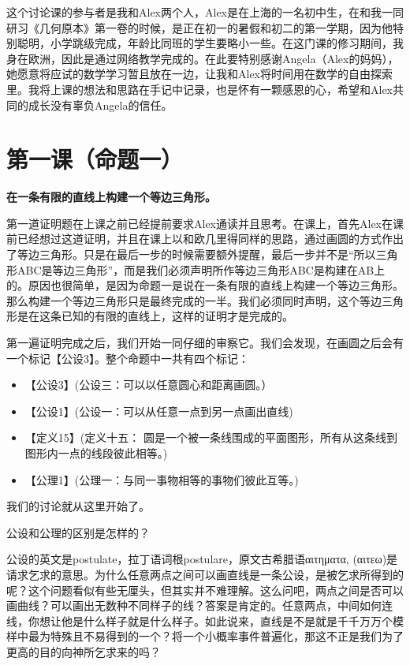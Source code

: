 \documentclass[
]{book}
\providecommand{\tightlist}{%
  \setlength{\itemsep}{0pt}\setlength{\parskip}{0pt}}
\begin{document}
这个讨论课的参与者是我和Alex两个人，Alex是在上海的一名初中生，在和我一同研习《几何原本》第一卷的时候，是正在初一的暑假和初二的第一学期，因为他特别聪明，小学跳级完成，年龄比同班的学生要略小一些。在这门课的修习期间，我身在欧洲，因此是通过网络教学完成的。在此要特别感谢Angela（Alex的妈妈），她愿意将应试的数学学习暂且放在一边，让我和Alex将时间用在数学的自由探索里。我将上课的想法和思路在手记中记录，也是怀有一颗感恩的心，希望和Alex共同的成长没有辜负Angela的信任。

\hypertarget{ux7b2cux4e00ux8bfeux547dux9898ux4e00}{%
\chapter{第一课（命题一）}\label{ux7b2cux4e00ux8bfeux547dux9898ux4e00}}

\textbf{在一条有限的直线上构建一个等边三角形。}

第一道证明题在上课之前已经提前要求Alex通读并且思考。在课上，首先Alex在课前已经想过这道证明，并且在课上以和欧几里得同样的思路，通过画圆的方式作出了等边三角形。只是在最后一步的时候需要额外提醒，最后一步并不是``所以三角形ABC是等边三角形''，而是我们必须声明所作等边三角形ABC是构建在AB上的。原因也很简单，是因为命题一是说在一条有限的直线上构建一个等边三角形。那么构建一个等边三角形只是最终完成的一半。我们必须同时声明，这个等边三角形是在这条已知的有限的直线上，这样的证明才是完成的。

第一遍证明完成之后，我们开始一同仔细的审察它。我们会发现，在画圆之后会有一个标记【公设3】。整个命题中一共有四个标记：

\begin{itemize}
\tightlist
\item
  【公设3】(公设三：可以以任意圆心和距离画圆。）
\item
  【公设1】(公设一：可以从任意一点到另一点画出直线)
\item
  【定义15】(定义十五： 圆是一个被一条线围成的平面图形，所有从这条线到图形内一点的线段彼此相等。)
\item
  【公理1】(公理一：与同一事物相等的事物们彼此互等。)
\end{itemize}

我们的讨论就从这里开始了。

公设和公理的区别是怎样的？

公设的英文是postulate，拉丁语词根postulare，原文古希腊语αιτηματα, (αιτεω)是请求乞求的意思。为什么任意两点之间可以画直线是一条公设，是被乞求所得到的呢？这个问题看似有些无厘头，但其实并不难理解。这么问吧，两点之间是否可以画曲线？可以画出无数种不同样子的线？答案是肯定的。任意两点，中间如何连线，你想让他是什么样子就是什么样子。如此说来，直线是不是就是千千万万个模样中最为特殊且不易得到的一个？将一个小概率事件普遍化，那这不正是我们为了更高的目的向神所乞求来的吗？
\end{document}
